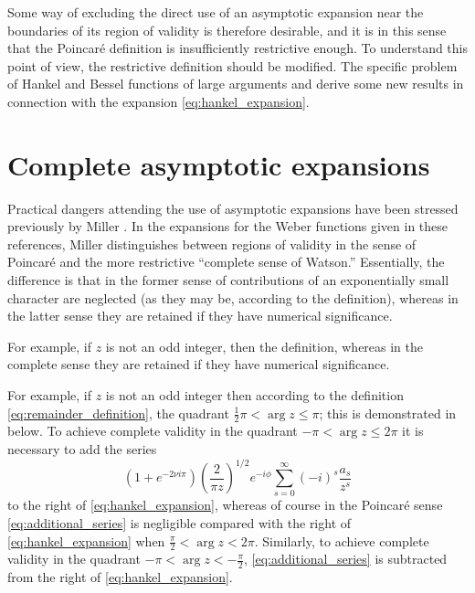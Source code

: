 \documentclass{article}
\begin{document}
Some way of excluding the direct use of an asymptotic expansion near the
boundaries of its region of validity is therefore desirable, and it is in this
sense that the Poincar{\'e} definition is insufficiently restrictive enough.
To understand this point of view, the restrictive definition should be
modified. The specific problem of Hankel and Bessel functions of large
arguments and derive some new results in connection with the expansion
\eqref{eq:hankel_expansion}.

\section{Complete asymptotic expansions}\label{sec:complete_expansions}

Practical dangers attending the use of asymptotic expansions have been
stressed previously by Miller {\cite{miller1}} {\cite{miller2}}. In the
expansions for the Weber functions given in these references, Miller
distinguishes between regions of validity in the sense of Poincar{\'e} and the
more restrictive ``complete sense of Watson.'' Essentially, the difference is
that in the former sense of contributions of an exponentially small character
are neglected (as they may be, according to the definition), whereas in the
latter sense they are retained if they have numerical significance.

For example, if $z$ is not an odd integer, then the definition, whereas in the
complete sense they are retained if they have numerical significance.

For example, if $z$ is not an odd integer then according to the definition
\eqref{eq:remainder_definition}, the quadrant $\frac{1}{2} \pi < \arg z \leq
\pi$; this is demonstrated in {\cite{watson_reference}} below. To achieve
complete validity in the quadrant $- \pi < \arg z \leq 2 \pi$ it is necessary
to add the series
\begin{equation}
  \label{eq:additional_series} (1 + e^{- 2 \nu i \pi}) \left( \frac{2}{\pi z}
  \right)^{1 / 2} e^{- i \phi}  \sum_{s = 0}^{\infty} (- i)^s \frac{a_s}{z^s}
\end{equation}
to the right of \eqref{eq:hankel_expansion}, whereas of course in the
Poincar{\'e} sense \eqref{eq:additional_series} is negligible compared with
the right of \eqref{eq:hankel_expansion} when $\frac{\pi}{2} < \arg z < 2
\pi$. Similarly, to achieve complete validity in the quadrant $- \pi < \arg z
< - \frac{\pi}{2}$, \eqref{eq:additional_series} is subtracted from the right
of \eqref{eq:hankel_expansion}.
\end{document}
